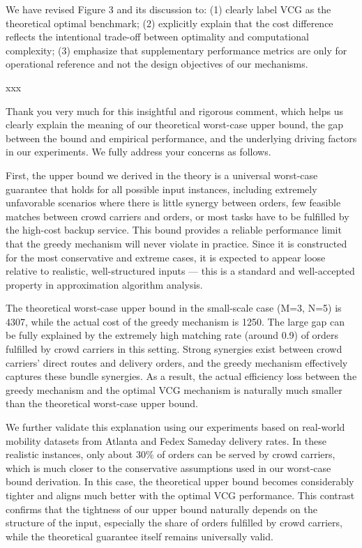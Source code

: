 \begin{revresponse}[1.3.1]
    We have revised Figure 3 and its discussion to: (1) clearly label VCG as the theoretical optimal benchmark; (2) explicitly explain that the cost difference reflects the intentional trade-off between optimality and computational complexity; (3) emphasize that supplementary performance metrics are only for operational reference and not the design objectives of our mechanisms.   
    
    \begin{changes}
        xxx
    \end{changes} 
\end{revresponse}




\begin{revresponse}[1.3.2]
	Thank you very much for this insightful and rigorous comment, which helps us clearly explain the meaning of our theoretical worst-case upper bound, the gap between the bound and empirical performance, and the underlying driving factors in our experiments. We fully address your concerns as follows.
    
    First, the upper bound we derived in the theory is a universal worst-case guarantee that holds for all possible input instances, including extremely unfavorable scenarios where there is little synergy between orders, few feasible matches between crowd carriers and orders, or most tasks have to be fulfilled by the high-cost backup service. This bound provides a reliable performance limit that the greedy mechanism will never violate in practice. Since it is constructed for the most conservative and extreme cases, it is expected to appear loose relative to realistic, well-structured inputs — this is a standard and well-accepted property in approximation algorithm analysis.
    
    The theoretical worst-case upper bound in the small-scale case (M=3, N=5) is 4307, while the actual cost of the greedy mechanism is 1250. The large gap can be fully explained by the extremely high matching rate (around 0.9) of orders fulfilled by crowd carriers in this setting. Strong synergies exist between crowd carriers' direct routes and delivery orders, and the greedy mechanism effectively captures these bundle synergies. As a result, the actual efficiency loss between the greedy mechanism and the optimal VCG mechanism is naturally much smaller than the theoretical worst-case upper bound.
    
    We further validate this explanation using our experiments based on real-world mobility datasets from Atlanta and Fedex Sameday delivery rates. In these realistic instances, only about 30\% of orders can be served by crowd carriers, which is much closer to the conservative assumptions used in our worst-case bound derivation. In this case, the theoretical upper bound becomes considerably tighter and aligns much better with the optimal VCG performance. This contrast confirms that the tightness of our upper bound naturally depends on the structure of the input, especially the share of orders fulfilled by crowd carriers, while the theoretical guarantee itself remains universally valid.
    

\end{revresponse}
